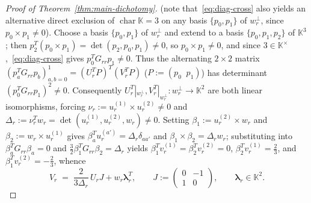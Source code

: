 \documentclass[11pt,reqno]{amsart}
\theoremstyle{definition}
\theoremstyle{remark}
\numberwithin{equation}{section}
\newcommand{\KK}{\mathbb{K}}
\DeclareMathOperator{\chr}{char}
\begin{document}
\begin{proof}[Proof of Theorem~\ref{thm:main-dichotomy}]
(note that~\eqref{eq:diag-cross} also yields an alternative direct exclusion of $\chr\KK = 3$ on any basis $\{p_0, p_1\}$ of $w_r^\perp$, since $p_0 \times p_1 \neq 0$). Choose a basis $\{p_0, p_1\}$ of $w_r^\perp$ and extend to a basis $\{p_0, p_1, p_2\}$ of $\KK^3$; then $p_2^T(p_0 \times p_1) = \det(p_2, p_0, p_1) \neq 0$, so $p_0 \times p_1 \neq 0$, and since $3 \in \KK^\times$,~\eqref{eq:diag-cross} gives $p_0^T G_{rr} p_1 \neq 0$. Thus the alternating $2 \times 2$ matrix $(p_a^T G_{rr} p_b)_{a,b=0}^1 = (U_r^T P)^T(V_r^T P)$ ($P := (p_0\;\; p_1)$) has determinant $(p_0^T G_{rr} p_1)^2 \neq 0$. Consequently $U_r^T|_{w_r^\perp}, V_r^T|_{w_r^\perp} : w_r^\perp \to \KK^2$ are both linear isomorphisms, forcing $\nu_r := u_r^{(1)} \times u_r^{(2)} \neq 0$ and $\Delta_r := \nu_r^T w_r = \det(u_r^{(1)}, u_r^{(2)}, w_r) \neq 0$. Setting $\beta_1 := u_r^{(2)} \times w_r$ and $\beta_2 := w_r \times u_r^{(1)}$ gives $\beta_a^T u_r^{(a')} = \Delta_r \delta_{aa'}$ and $\beta_1 \times \beta_2 = \Delta_r w_r$; substituting into $\beta_a^T G_{rr}\beta_a = 0$ and $\frac{3}{2}\beta_1^T G_{rr}\beta_2 = \Delta_r$ yields $\beta_1^T v_r^{(1)} = \beta_2^T v_r^{(2)} = 0$, $\beta_2^T v_r^{(1)} = \frac{2}{3}$, and $\beta_1^T v_r^{(2)} = -\frac{2}{3}$, whence
\begin{equation}\label{eq:Vr-formula}
  V_r \;=\; \frac{2}{3\Delta_r}\, U_r J + w_r \boldsymbol{\lambda}_r^T, \qquad
  J := \begin{pmatrix} 0 & -1 \\ 1 & 0 \end{pmatrix}, \qquad \boldsymbol{\lambda}_r \in \KK^2.
\end{equation}


\end{proof}
\end{document}
